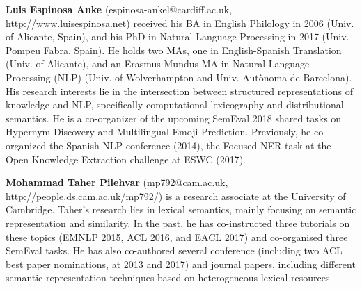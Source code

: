  {\bfseries Luis Espinosa Anke} (espinosa-ankel@cardiff.ac.uk, http://www.luisespinosa.net) received his BA in English Philology in 2006 (Univ. of Alicante, Spain), and his PhD in Natural Language Processing in 2017 (Univ. Pompeu Fabra, Spain). He holds two MAs, one in English-Spanish Translation (Univ. of Alicante), and an Erasmus Mundus MA in Natural Language Processing (NLP) (Univ. of Wolverhampton and Univ. Aut\`{o}noma de Barcelona). His research interests lie in the intersection between structured representations of knowledge and NLP, specifically computational lexicography and distributional semantics. He is a co-organizer of the upcoming SemEval 2018 shared tasks on Hypernym Discovery and Multilingual Emoji Prediction. Previously, he co-organized the Spanish NLP conference (2014), the Focused NER task at the Open Knowledge Extraction challenge at ESWC (2017).

  {\bfseries Mohammad Taher Pilehvar} (mp792@cam.ac.uk, http://people.ds.cam.ac.uk/mp792/) is a research associate at the University of Cambridge. Taher’s research lies in lexical semantics, mainly focusing on semantic representation and similarity. In the past, he has co-instructed three tutorials on these topics (EMNLP 2015, ACL 2016, and EACL 2017) and co-organised three SemEval tasks. He has also co-authored several conference (including two ACL best paper nominations, at 2013 and 2017) and journal papers, including different semantic representation techniques based on heterogeneous lexical resources.
